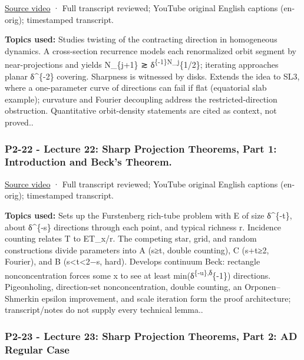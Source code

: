 \hypertarget{04-visual-computing-ii-ch036-p2-21---lecture-21-homogeneous-dynamics-part-2}{}

\href{https://www.youtube.com/watch?v=5QV8Gr1z16E}{Source video} · Full transcript reviewed; YouTube original English captions (en-orig); timestamped transcript.

\textbf{Topics used:} Studies twisting of the contracting direction in homogeneous dynamics. A cross-section recurrence models each renormalized orbit segment by near-projections and yields N\_\{j+1\} ≳ δ\textsuperscript{\{-1\}N\_j}\{1/2\}; iterating approaches planar δ\^{}\{-2\} covering. Sharpness is witnessed by disks. Extends the idea to SL3, where a one-parameter curve of directions can fail if flat (equatorial slab example); curvature and Fourier decoupling address the restricted-direction obstruction. Quantitative orbit-density statements are cited as context, not proved..

\subsubsection{P2-22 - Lecture 22: Sharp Projection Theorems, Part 1: Introduction and Beck's Theorem.}\label{04-visual-computing-ii-ch036-p2-22---lecture-22-sharp-projection-theorems-part-1-introduction-and-becks-theorem.}

\hypertarget{04-visual-computing-ii-ch036-p2-22---lecture-22-sharp-projection-theorems-part-1-introduction-and-becks-theorem.}{}

\href{https://www.youtube.com/watch?v=hBG7nMXTOcw}{Source video} · Full transcript reviewed; YouTube original English captions (en-orig); timestamped transcript.

\textbf{Topics used:} Sets up the Furstenberg rich-tube problem with E of size δ\^{}\{-t\}, about δ\^{}\{-s\} directions through each point, and typical richness r. Incidence counting relates \textbar T\textbar{} to \textbar E\textbar\textbar T\_x\textbar/r. The competing star, grid, and random constructions divide parameters into A (s≥t, double counting), C (s+t≥2, Fourier), and B (s\textless t\textless2−s, hard). Develops continuum Beck: rectangle nonconcentration forces some x to see at least min(δ\textsuperscript{\{-u\},δ}\{-1\}) directions. Pigeonholing, direction-set nonconcentration, double counting, an Orponen--Shmerkin epsilon improvement, and scale iteration form the proof architecture; transcript/notes do not supply every technical lemma..

\subsubsection{P2-23 - Lecture 23: Sharp Projection Theorems, Part 2: AD Regular Case}\label{04-visual-computing-ii-ch036-p2-23---lecture-23-sharp-projection-theorems-part-2-ad-regular-case}

